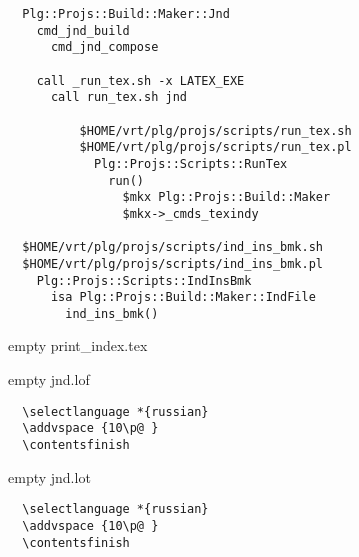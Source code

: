  
 
 
 
 

\begin{verbatim}
  Plg::Projs::Build::Maker::Jnd
    cmd_jnd_build
      cmd_jnd_compose

    call _run_tex.sh -x LATEX_EXE
      call run_tex.sh jnd
	
		  $HOME/vrt/plg/projs/scripts/run_tex.sh
		  $HOME/vrt/plg/projs/scripts/run_tex.pl
		    Plg::Projs::Scripts::RunTex
		      run()
		        $mkx Plg::Projs::Build::Maker
		        $mkx->_cmds_texindy

  $HOME/vrt/plg/projs/scripts/ind_ins_bmk.sh
  $HOME/vrt/plg/projs/scripts/ind_ins_bmk.pl
    Plg::Projs::Scripts::IndInsBmk
      isa Plg::Projs::Build::Maker::IndFile
        ind_ins_bmk()
\end{verbatim}

empty print_index.tex

empty jnd.lof

\begin{verbatim}
  \selectlanguage *{russian}
  \addvspace {10\p@ }
  \contentsfinish
\end{verbatim}

empty jnd.lot

\begin{verbatim}
  \selectlanguage *{russian}
  \addvspace {10\p@ }
  \contentsfinish
\end{verbatim}
